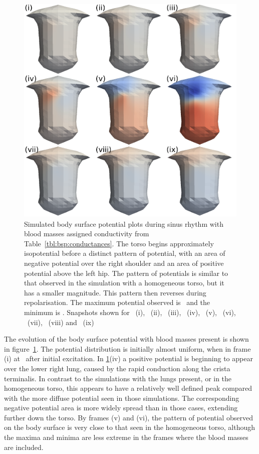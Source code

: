 \begin{figure}
\includegraphics{figures/bsp/bsp_blood}
\caption[Body Surface Potential snapshots, with blood masses]{
\label{bsp:fig:blood_bsp}
Simulated body surface potential plots during sinus rhythm with blood masses assigned
conductivity from Table~\ref{tbl:bsp:conductances}.
The torso begins approximately isopotential before a distinct pattern of
potential, with an area of negative potential over the right shoulder and an
area of positive potential above the left hip.
The pattern of potentials is similar to that observed in the simulation with a
homogeneous torso, but it has a smaller magnitude.
This pattern then reverses during repolarisation.
The maximum potential observed is \ and the minimum is .
Snapshots shown for \ (i), \ (ii), \ (iii), \ (iv),
\ (v), \ (vi), \ (vii), \ (viii) and \
(ix)
}
\end{figure}

The evolution of the body surface potential with blood masses present is shown in
figure~\ref{bsp:fig:blood_bsp}.
The potential distribution is initially almost uniform, when  in frame (i) at
\ms{10}\ after initial excitation.
In \ref{bsp:fig:blood_bsp}(iv) a positive potential is beginning to appear over
the lower right lung, caused by the rapid conduction along the crista
terminalis.
In contrast to the simulations with the lungs present, or in the homogeneous
torso, this appears to have a relatively well defined peak compared with the
more diffuse potential seen in those simulations.
The corresponding negative potential area is more widely spread than in those
cases, extending further down the torso.
By frames (v) and (vi), the pattern of potential observed on the body surface is
very close to that seen in the homogeneous torso, although the maxima and minima
are less extreme in the frames where the blood masses are included.

